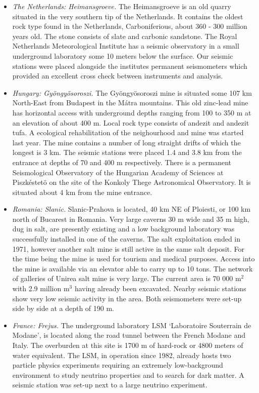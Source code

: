 \begin{itemize}

\item \emph{The Netherlands: Heimansgroeve.}
The Heimansgroeve is an old quarry situated in the very southern tip of the Netherlands. It contains the oldest rock type found in the Netherlands, Carboniferious, about 360 - 300 million years old. The stone consists of slate and carbonic sandstone. The Royal Netherlands Meteorological Institute has a seismic observatory in a small underground laboratory some 10 meters below the surface. Our seismic stations were placed alongside the institutes permanent seismometers which provided an excellent cross check between instruments and analysis.

\item \emph{Hungary: Gy\"ongy\"osoroszi.}
The Gy\"ongy\"osoroszi mine is situated some 107 km North-East from Budapest in the M\'atra mountains. This old zinc-lead mine has horizontal access with underground depths ranging from 100 to 350 m at an elevation of about 400 m. Local rock type consists of andezit and andezit tufa. A ecological rehabilitation of the neighourhood and mine was started last year. The mine contains a number of long straight drifts of which the longest is 3 km. The seismic stations were placed 1.4 and 3.8 km from the entrance at depths of 70 and 400 m respectively. There is a permanent Seismological Observatory of the Hungarian Academy of Sciences at Piszk\'estet\"o on the site of the Konkoly Thege Astronomical Observatory. It is situated about 4 km from the mine entrance.

\item \emph{Romania: Slanic.}
Slanic-Prahova is located, 40 km NE of Ploiesti, or 100 km north of Bucarest in Romania. Very large caverns 30 m wide and 35 m high, dug in salt, are presently existing and a low background laboratory was successfully installed in one of the caverns. The salt exploitation ended in 1971, however another salt mine is still active in the same salt deposit. For the time being the mine is used for tourism and medical purposes. Access into the mine is available via an elevator able to carry up to 10 tons. The network of galleries of Unirea salt mine is very large. The current area is 70 000 m$^2$ with 2.9 million m$^3$ having already been excavated. Nearby seismic stations show very low seismic activity in the area. Both seismometers were set-up side by side at a depth of 190 m.

\item \emph{France: Frejus.}
The underground laboratory LSM `Laboratoire Souterrain de Modane', is located along the road tunnel between the French Modane and Italy. The overburden at this site is 1700 m of hard-rock or 4800 meters of water equivalent. The LSM, in operation since 1982, already hosts two particle physics experiments requiring an extremely low-background environment to study neutrino properties and to search for dark matter. A seismic station was set-up next to a large neutrino experiment.


\end{itemize}
